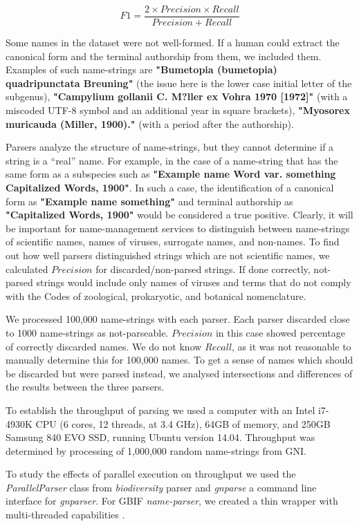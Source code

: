 \documentclass{bmcart}
\begin{document}
\[F1 = \dfrac{2 \times Precision \times Recall}{Precision + Recall}\]


Some names in the dataset were not well-formed. If a human could extract the
canonical form and the terminal authorship from them, we included them.
Examples of such name-strings are \textbf{"Bumetopia (bumetopia) quadripunctata
Breuning"} (the issue here is the lower case initial letter of the subgenus), \textbf{"Campylium
gollanii C. M?ller ex Vohra 1970 [1972]"} (with a miscoded UTF-8 symbol and an
additional year in square brackets), \textbf{"Myosorex muricauda (Miller,
1900)."} (with a period after the authorship).

Parsers analyze the structure of name-strings, but they cannot determine if
a string is a ``real'' name. For example, in the case of a name-string that has
the same form as a subspecies such as \textbf{"Example name Word var. something
Capitalized Words, 1900"}. In such a case, the identification of a canonical
form as \textbf{"Example name something"} and terminal authorship as
\textbf{"Capitalized Words, 1900"} would be considered a true positive. Clearly, it will be important for name-management services to  distinguish between name-strings of
scientific names, names of viruses, surrogate names, and non-names. To find out
how well parsers distinguished strings which are not scientific names, we
calculated $Precision$ for discarded/non-parsed strings. If done correctly,
not-parsed strings would include only names of viruses and terms that do not
comply with the Codes of zoological, prokaryotic, and botanical nomenclature.

We processed 100,000 name-strings with each parser.  Each parser discarded
close to 1000 name-strings as not-parseable.  $Precision$ in this case showed
percentage of correctly discarded names.  We do not know $Recall$, as it was
not reasonable to manually determine this for 100,000 names. To get a sense of
names which should be discarded but were parsed instead, we analysed
intersections and differences of the results between the three parsers.

To establish the throughput of parsing we used a computer with an Intel
i7-4930K CPU (6 cores, 12 threads, at 3.4 GHz), 64GB of memory, and 250GB
Samsung 840 EVO SSD, running Ubuntu version 14.04. Throughput was determined by
processing of 1,000,000 random name-strings from GNI.

To study the effects of parallel execution on throughput we used the
\textit{ParallelParser} class from \textit{biodiversity} parser and
\textit{gnparse} a command line interface for \textit{gnparser}. For GBIF
\textit{name-parser}, we created a thin wrapper with multi-threaded
capabilities \cite{gbifparser}.
\end{document}
